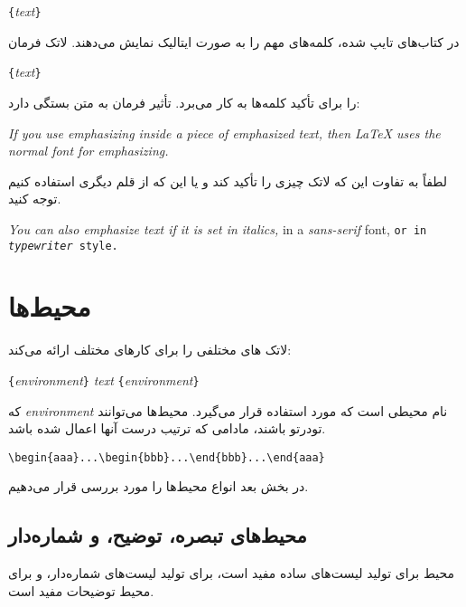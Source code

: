 \begin{lscommand}
\verb|{|\emph{text}\verb|}|
\end{lscommand}

در کتاب‌های تایپ شده، کلمه‌های مهم را به صورت ایتالیک  نمایش می‌دهند. لاتک فرمان 

\begin{lscommand}
\verb|{|\emph{text}\verb|}|
\end{lscommand}

\noindent
را برای تأکید کلمه‌ها به کار می‌برد. تأثیر فرمان به متن بستگی دارد:

\begin{example}
\emph{If you use 
  emphasizing inside a piece
  of emphasized text, then 
  \LaTeX{} uses the
  \emph{normal} font for 
  emphasizing.}
\end{example}
لطفاً به تفاوت این که لاتک چیزی را تأکید کند و یا این که از قلم دیگری استفاده کنیم توجه کنید.

\begin{example}
\textit{You can also
  \emph{emphasize} text if 
  it is set in italics,} 
\textsf{in a 
  \emph{sans-serif} font,}
\texttt{or in 
  \emph{typewriter} style.}
\end{example}

\section{محیط‌ها} \label{env}
لاتک 
های
مختلفی را برای کارهای مختلف ارائه می‌کند:

\begin{lscommand}
\verb|{|\emph{environment}\verb|}|\quad
   \emph{text}\quad
{}\verb|{|\emph{environment}\verb|}|
\end{lscommand}

\noindent 
که 
\emph{environment}
نام محیطی است که مورد استفاده قرار می‌گیرد. محیط‌ها می‌توانند تودرتو باشند، مادامی که ترتیب درست آنها اعمال شده باشد.
\begin{code}
\verb|\begin{aaa}...\begin{bbb}...\end{bbb}...\end{aaa}|
\end{code}

\noindent 
در بخش بعد انواع محیط‌ها را مورد بررسی قرار می‌دهیم.
\subsection{محیط‌های تبصره، توضیح، و شماره‌دار}
محیط 
برای تولید لیست‌های ساده مفید است، 
برای تولید لیست‌های شماره‌دار، و 
برای محیط توضیحات مفید است.

